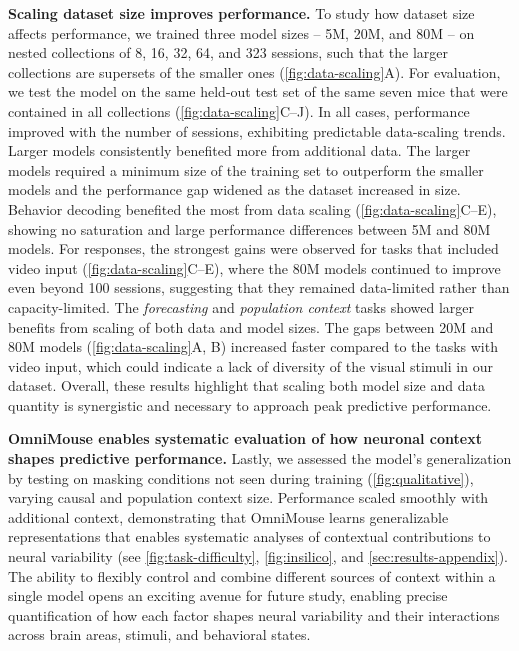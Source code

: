 \documentclass{article} %
\begin{document}
\textbf{Scaling dataset size improves performance.}
To study how dataset size affects performance, we trained three model sizes -- 5M, 20M, and 80M -- on nested collections of 8, 16, 32, 64, and 323 sessions, such that the larger collections are supersets of the smaller ones (\cref{fig:data-scaling}A).
For evaluation, we test the model on the same held-out test set of the same seven mice that were contained in all collections (\cref{fig:data-scaling}C--J). 
In all cases, performance improved with the number of sessions, exhibiting predictable data-scaling trends.
Larger models consistently benefited more from additional data.
The larger models required a minimum size of the training set to outperform the smaller models and the performance gap widened as the dataset increased in size. 
Behavior decoding benefited the most from data scaling (\cref{fig:data-scaling}C--E), showing no saturation and large performance differences between 5M and 80M models.
For responses, the strongest gains were observed for tasks that included video input (\cref{fig:data-scaling}C--E), where the 80M models continued to improve even beyond 100 sessions, suggesting that they remained data-limited rather than capacity-limited. 
The \textit{forecasting} and \textit{population context} tasks showed larger benefits from scaling of both data and model sizes.
The gaps between 20M and 80M models (\cref{fig:data-scaling}A, B) increased faster compared to the tasks with video input, which could indicate a lack of diversity of the visual stimuli in our dataset. 
Overall, these results highlight that scaling both model size and data quantity is synergistic and necessary to approach peak predictive performance.

\textbf{OmniMouse enables systematic evaluation of how neuronal context shapes predictive performance.} Lastly, we assessed the model's generalization by testing on masking conditions not seen during training (\cref{fig:qualitative}), varying causal and population context size. Performance scaled smoothly with additional context, demonstrating that OmniMouse learns generalizable representations that enables systematic analyses of contextual contributions to neural variability (see \cref{fig:task-difficulty}, \cref{fig:insilico}, and \cref{sec:results-appendix}). The ability to flexibly control and combine different sources of context within a single model opens an exciting avenue for future study, enabling precise quantification of how each factor shapes neural variability and their interactions across brain areas, stimuli, and behavioral states.
\end{document}
